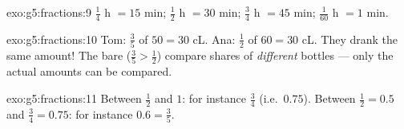 \begin{solution}{exo:g5:fractions:9}
$\frac14$ h $= 15$ min; $\frac12$ h $= 30$ min; $\frac34$ h $= 45$
min; $\frac{1}{60}$ h $= 1$ min.
\end{solution}

\begin{solution}{exo:g5:fractions:10}
Tom: $\frac35$ of $50 = 30$ cL. Ana: $\frac12$ of $60 = 30$ cL. They
drank the same amount! The bare  ($\frac35 > \frac12$)
compare shares of \emph{different} bottles --- only the actual
amounts can be compared.
\end{solution}

\begin{solution}{exo:g5:fractions:11}
Between $\frac12$ and $1$: for instance $\frac34$ (i.e.\ $0.75$).
Between $\frac12 = 0.5$ and $\frac34 = 0.75$: for instance $0.6 =
\frac35$.
\end{solution}
